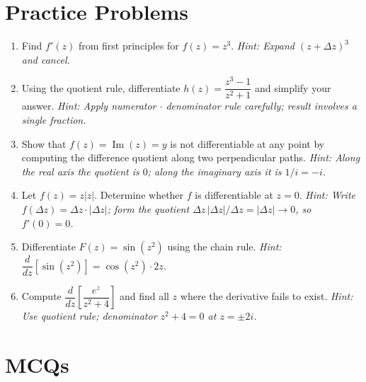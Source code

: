 \documentclass[12pt,a4paper]{article}
\begin{document}
\section{Practice Problems}

\begin{enumerate}[label=\textbf{P\arabic*.}, leftmargin=2.5em]

\item Find $f'(z)$ from first principles for $f(z) = z^3$.
      \textit{Hint: Expand $(z+\Delta z)^3$ and cancel.}

\item Using the quotient rule, differentiate $h(z) = \dfrac{z^3-1}{z^2+1}$ and
      simplify your answer.
      \textit{Hint: Apply numerator $\cdot$ denominator rule carefully; result involves a
      single fraction.}

\item Show that $f(z) = \operatorname{Im}(z) = y$ is not differentiable at any point by
      computing the difference quotient along two perpendicular paths.
      \textit{Hint: Along the real axis the quotient is $0$; along the imaginary axis it is $1/i = -i$.}

\item Let $f(z) = z|z|$. Determine whether $f$ is differentiable at $z = 0$.
      \textit{Hint: Write $f(\Delta z) = \Delta z \cdot |\Delta z|$; form the quotient
      $\Delta z\,|\Delta z|/\Delta z = |\Delta z| \to 0$, so $f'(0) = 0$.}

\item Differentiate $F(z) = \sin(z^2)$ using the chain rule.
      \textit{Hint: $\dfrac{d}{dz}[\sin(z^2)] = \cos(z^2)\cdot 2z$.}

\item Compute $\dfrac{d}{dz}\!\left[\dfrac{e^z}{z^2+4}\right]$ and find all $z$ where the
      derivative fails to exist.
      \textit{Hint: Use quotient rule; denominator $z^2+4 = 0$ at $z = \pm 2i$.}

\end{enumerate}

\section{MCQs}
\end{document}
